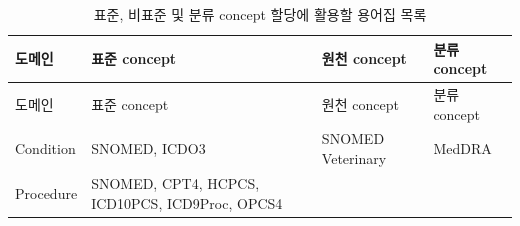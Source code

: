 \documentclass[11pt]{book}
\theoremstyle{definition}
\theoremstyle{definition}
\theoremstyle{definition}
\theoremstyle{remark}
\begin{document}
\begin{longtable}[]{@{}llll@{}}
\caption{\label{tab:vocabList} 표준, 비표준 및 분류 concept 할당에 활용할
용어집 목록}\tabularnewline
\toprule
\begin{minipage}[b]{0.12\columnwidth}\raggedright\strut
도메인\strut
\end{minipage} & \begin{minipage}[b]{0.21\columnwidth}\raggedright\strut
표준 concept\strut
\end{minipage} & \begin{minipage}[b]{0.21\columnwidth}\raggedright\strut
원천 concept\strut
\end{minipage} & \begin{minipage}[b]{0.18\columnwidth}\raggedright\strut
분류 concept\strut
\end{minipage}\tabularnewline
\midrule
\endfirsthead
\toprule
\begin{minipage}[b]{0.12\columnwidth}\raggedright\strut
도메인\strut
\end{minipage} & \begin{minipage}[b]{0.21\columnwidth}\raggedright\strut
표준 concept\strut
\end{minipage} & \begin{minipage}[b]{0.21\columnwidth}\raggedright\strut
원천 concept\strut
\end{minipage} & \begin{minipage}[b]{0.18\columnwidth}\raggedright\strut
분류 concept\strut
\end{minipage}\tabularnewline
\midrule
\endhead
\begin{minipage}[t]{0.12\columnwidth}\raggedright\strut
Condition\strut
\end{minipage} & \begin{minipage}[t]{0.21\columnwidth}\raggedright\strut
SNOMED, ICDO3\strut
\end{minipage} & \begin{minipage}[t]{0.21\columnwidth}\raggedright\strut
SNOMED Veterinary\strut
\end{minipage} & \begin{minipage}[t]{0.18\columnwidth}\raggedright\strut
MedDRA\strut
\end{minipage}\tabularnewline
\begin{minipage}[t]{0.12\columnwidth}\raggedright\strut
Procedure\strut
\end{minipage} & \begin{minipage}[t]{0.21\columnwidth}\raggedright\strut
SNOMED, CPT4, HCPCS, ICD10PCS, ICD9Proc, OPCS4\strut

\end{minipage}
\end{longtable}
\end{document}
